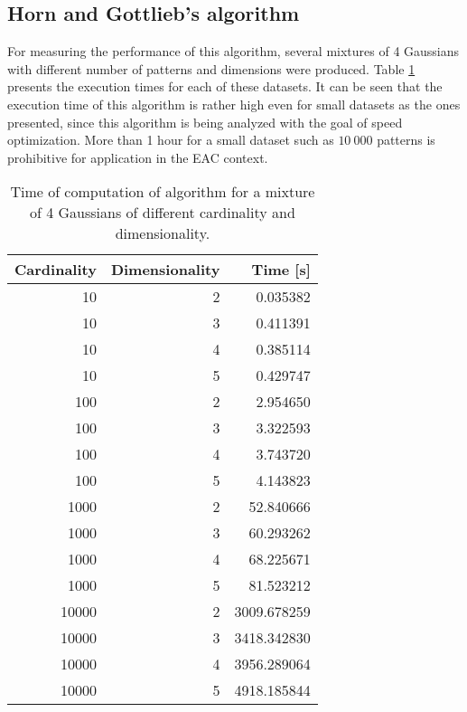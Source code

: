 



\subsection{Horn and Gottlieb's algorithm}

For measuring the performance of this algorithm, several mixtures of 4 Gaussians with different number of patterns and dimensions were produced. %
Table \ref{tab:horn performance} presents the execution times for each of these datasets.
It can be seen that the execution time of this algorithm is rather high even for small datasets as the ones presented, since this algorithm is being analyzed with the goal of speed optimization.
More than 1 hour for a small dataset such as $10 \: 000$ patterns is prohibitive for application in the EAC context.

\begin{table}[h]
\centering
\caption{Time of computation of \citet{Horn2001b} algorithm for a mixture of 4 Gaussians of different cardinality and dimensionality.}

\begin{tabular}{rrr}
\toprule
 Cardinality &  Dimensionality &     Time [s] \\
\midrule
          10 &               2 &     0.035382 \\
          10 &               3 &     0.411391 \\
          10 &               4 &     0.385114 \\
          10 &               5 &     0.429747 \\
         100 &               2 &     2.954650 \\
         100 &               3 &     3.322593 \\
         100 &               4 &     3.743720 \\
         100 &               5 &     4.143823 \\
        1000 &               2 &    52.840666 \\
        1000 &               3 &    60.293262 \\
        1000 &               4 &    68.225671 \\
        1000 &               5 &    81.523212 \\
       10000 &               2 &  3009.678259 \\
       10000 &               3 &  3418.342830 \\
       10000 &               4 &  3956.289064 \\
       10000 &               5 &  4918.185844 \\
\bottomrule
\end{tabular}

\label{tab:horn performance}
\end{table}


